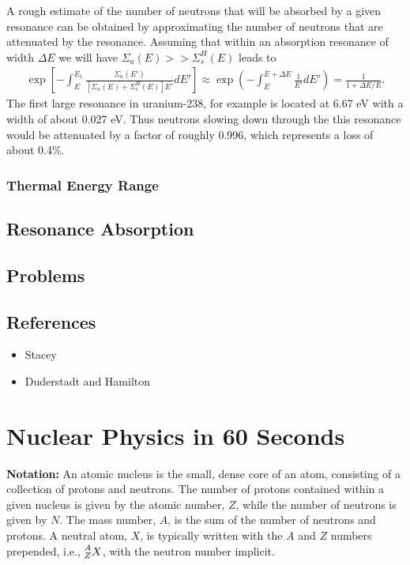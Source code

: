 \documentclass[11pt]{article}
\newcommand\leftidx[3]{{\vphantom{#2}}#1#2#3}
\begin{document}
A rough estimate of the number of neutrons that will be absorbed by a given resonance can be obtained by approximating the number of neutrons that are attenuated by the resonance.  Assuming that within an absorption resonance of width \(\Delta E\) we will have \(\Sigma_a(E) >> \Sigma_s^H(E)\) leads to
\begin{align}
  \exp\left[ -\int_E^{E_1} \frac{\Sigma_a(E')}{\left[ \Sigma_a(E) + \Sigma_s^H(E) \right] E'} dE' \right]
  \approx \exp\left( -\int_E^{E+\Delta E} \frac{1}{E'} dE' \right)
  = \frac{1}{1+\Delta E/E}.
\end{align}
The first large resonance in uranium-238, for example is located at 6.67 eV with a width of about 0.027 eV.  Thus neutrons slowing down through the this resonance would be attenuated by a factor of roughly 0.996, which represents a loss of about 0.4\%.

\subsubsection{Thermal Energy Range}
\label{sec:orgheadline28}
\subsection{Resonance Absorption}
\label{sec:orgheadline30}
\subsection{Problems}
\label{sec:orgheadline31}
\subsection{References}
\label{sec:orgheadline32}
\begin{itemize}
\item Stacey
\item Duderstadt and Hamilton
\end{itemize}
\section{Nuclear Physics in 60 Seconds}
\label{sec:orgheadline34}
\textbf{Notation:} An atomic nucleus is the small, dense core of an atom, consisting of a collection of protons and neutrons.  The number of protons contained within a given nucleus is given by the atomic number, \(Z\), while the number of neutrons is given by \(N\).  The mass number, \(A\), is the sum of the number of neutrons and protons.  A neutral atom, \(X\), is typically written with the \(A\) and \(Z\) numbers prepended, i.e., \(\leftidx{^A_Z}{X}{}\), with the neutron number implicit.
\end{document}
